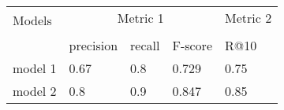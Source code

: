 

\begin{tabular}{lllll}
    \toprule
    \multirow{2}{*}{Models} & \multicolumn{3}{c}{Metric 1} & Metric 2\\
    \cmidrule{2-4} \cmidrule{5-5} \\
    {} & precision & recall & F-score  & R@10 \\
    \midrule
    model 1 & 0.67  & 0.8 & 0.729  & 0.75 \\
    model 2 & 0.8 & 0.9 & 0.847 & 0.85 \\
    \bottomrule
\end{tabular}
